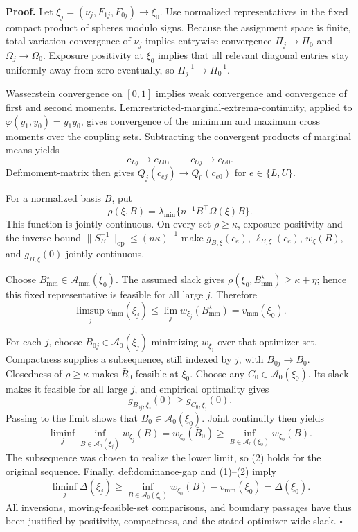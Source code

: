 \textbf{Proof.}
Let \(\xi_j=(\nu_j,F_{1j},F_{0j})\to\xi_0\).  Use normalized representatives in the fixed compact product of spheres modulo signs.  Because the assignment space is finite, total-variation convergence of \(\nu_j\) implies entrywise convergence \(\Pi_j\to\Pi_0\) and \(\Omega_j\to\Omega_0\).  Exposure positivity at \(\xi_0\) implies that all relevant diagonal entries stay uniformly away from zero eventually, so \(\Pi_j^{-1}\to\Pi_0^{-1}\).

Wasserstein convergence on \([0,1]\) implies weak convergence and convergence of first and second moments.  Lem:restricted-marginal-extrema-continuity, applied to \(\varphi(y_1,y_0)=y_1y_0\), gives convergence of the minimum and maximum cross moments over the coupling sets.  Subtracting the convergent products of marginal means yields
\[
 c_{Lj}\to c_{L0},\qquad c_{Uj}\to c_{U0}.
\]
Def:moment-matrix then gives \(Q_j(c_{ej})\to Q_0(c_{e0})\) for \(e\in\{L,U\}\).

For a normalized basis \(B\), put
\[
 \rho(\xi,B)=\lambda_{\min}\{n^{-1}B^{\top}\Omega(\xi)B\}.
\]
This function is jointly continuous.  On every set \(\rho\ge\kappa\), exposure positivity and the inverse bound \(\lVert S_B^{-1}\rVert_{\mathrm{op}}\le(n\kappa)^{-1}\) make \(g_{B,\xi}(c_e)\), \(\ell_{B,\xi}(c_e)\), \(w_\xi(B)\), and \(g_{B,\xi}(0)\) jointly continuous.

Choose \(B^\star_{\mathrm{mm}}\in\mathcal A_{\mathrm{mm}}(\xi_0)\).  The assumed slack gives \(\rho(\xi_0,B^\star_{\mathrm{mm}})\ge\kappa+\eta\); hence this fixed representative is feasible for all large \(j\).  Therefore
\[
 \limsup_j v_{\mathrm{mm}}(\xi_j)
 \le\lim_j w_{\xi_j}(B^\star_{\mathrm{mm}})
 =v_{\mathrm{mm}}(\xi_0). \tag{1}
\]

For each \(j\), choose \(B_{0j}\in\mathcal A_0(\xi_j)\) minimizing \(w_{\xi_j}\) over that optimizer set.  Compactness supplies a subsequence, still indexed by \(j\), with \(B_{0j}\to\bar B_0\).  Closedness of \(\rho\ge\kappa\) makes \(\bar B_0\) feasible at \(\xi_0\).  Choose any \(C_0\in\mathcal A_0(\xi_0)\).  Its slack makes it feasible for all large \(j\), and empirical optimality gives
\[
 g_{B_{0j},\xi_j}(0)\ge g_{C_0,\xi_j}(0).
\]
Passing to the limit shows that \(\bar B_0\in\mathcal A_0(\xi_0)\).  Joint continuity then yields
\[
 \liminf_j\inf_{B\in\mathcal A_0(\xi_j)}w_{\xi_j}(B)
 =w_{\xi_0}(\bar B_0)
 \ge\inf_{B\in\mathcal A_0(\xi_0)}w_{\xi_0}(B). \tag{2}
\]
The subsequence was chosen to realize the lower limit, so (2) holds for the original sequence.  Finally, def:dominance-gap and (1)--(2) imply
\[
 \liminf_j\Delta(\xi_j)
 \ge \inf_{B\in\mathcal A_0(\xi_0)}w_{\xi_0}(B)-v_{\mathrm{mm}}(\xi_0)
 =\Delta(\xi_0).
\]
All inversions, moving-feasible-set comparisons, and boundary passages have thus been justified by positivity, compactness, and the stated optimizer-wide slack. \(\square\)